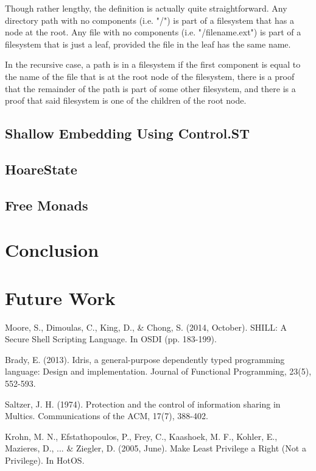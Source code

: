 \documentclass[11pt,a4paper]{article}
\begin{document}
Though rather lengthy, the definition is actually quite straightforward. Any directory path with no components (i.e. "/") is part of a filesystem that has a node at the root. Any file with no components (i.e. "/filename.ext") is part of a filesystem that is just a leaf, provided the file in the leaf has the same name. 

In the recursive case, a path is in a filesystem if the first component is equal to the name of the file that is at the root node of the filesystem, there is a proof that the remainder of the path is part of some other filesystem, and there is a proof that said filesystem is one of the children of the root node. 



\subsection{Shallow Embedding Using Control.ST}

\subsection{HoareState}

\subsection{Free Monads}

\section{Conclusion}

\section{Future Work}

\begin{thebibliography}{99}
Moore, S., Dimoulas, C., King, D., \& Chong, S. (2014, October). SHILL: A Secure Shell Scripting Language. In OSDI (pp. 183-199).

Brady, E. (2013). Idris, a general-purpose dependently typed programming language: Design and implementation. Journal of Functional Programming, 23(5), 552-593.

Saltzer, J. H. (1974). Protection and the control of information sharing in Multics. Communications of the ACM, 17(7), 388-402.

Krohn, M. N., Efstathopoulos, P., Frey, C., Kaashoek, M. F., Kohler, E., Mazieres, D., ... \& Ziegler, D. (2005, June). Make Least Privilege a Right (Not a Privilege). In HotOS.

\end{thebibliography}
\end{document}
